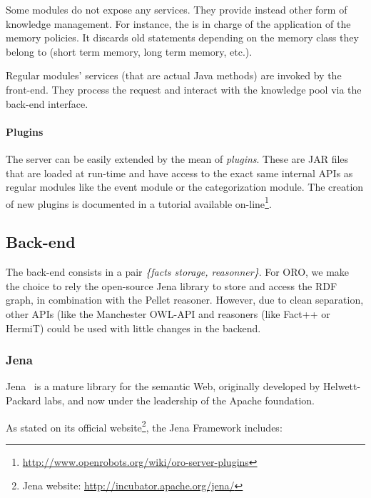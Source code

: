 Some modules do not expose any services. They provide instead other form of
knowledge management. For instance, the  is in charge of
the application of the memory policies. It discards old statements depending on
the memory class they belong to (short term memory, long term memory, etc.).

Regular modules' services (that are actual Java methods) are invoked by the
front-end.  They process the request and interact with the knowledge pool via
the back-end interface.

\paragraph{Plugins} The server can be easily extended by the mean of
\emph{plugins}. These are JAR files that are loaded at run-time and have access
to the exact same internal APIs as regular modules like the event module or the
categorization module. The creation of new plugins is documented in a tutorial
available
on-line\footnote{\url{http://www.openrobots.org/wiki/oro-server-plugins}}.

\subsection{Back-end}
\label{sect|backend}

The back-end consists in a pair \emph{\{facts storage, reasonner\}}. For ORO,
we make the choice to rely the open-source {\sc Jena} library to store and
access the RDF graph, in combination with the {\sc Pellet} reasoner. However,
due to clean separation, other APIs (like the {\sc Manchester OWL-API} and
reasoners (like {\sc Fact++} or {\sc HermiT}) could be used with little changes
in the backend.

\subsubsection{Jena}
\label{sect|jena}

{\sc Jena}~\cite{McBride2002} is a mature library for the semantic Web,
originally developed by Helwett-Packard labs, and now under the leadership of
the Apache foundation.

As stated on its official website\footnote{{\sc Jena} website:
\url{http://incubator.apache.org/jena/}}, the Jena Framework includes:

